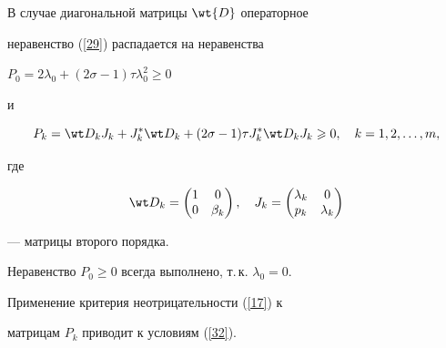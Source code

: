 \begin{pf}


В случае диагональной матрицы $\wt{D}$ операторное


неравенство (\ref{29}) распадается на неравенства 


$P_0=2\lambda_0+(2\sigma-1)\tau \lambda_0^2 \geqslant 0$


и


\begin{equation}\label{33}


P_{k}=\wt D_k J_k+J_k^* \wt D_k+(2\sigma-1)\tau


J_k^* \wt D_k J_k \geqslant 0,\quad k=1,2, \dotsc,m,


\end{equation}


где 


$$


\wt D_k=\begin{pmatrix}


1 & 0 \\


0 & {\beta_k}


\end{pmatrix},\quad J_k=\begin{pmatrix}


{\lambda_k} & 0 \\


{p_k} & {\lambda_k}


\end{pmatrix}


$$


--- матрицы второго порядка.


Неравенство $P_0 \geqslant 0$ всегда выполнено, т.\,к. $\lambda_0=0$.


Применение критерия неотрицательности (\ref{17}) к


матрицам $P_{k}$ приводит к условиям (\ref{32}).


\end{pf}





